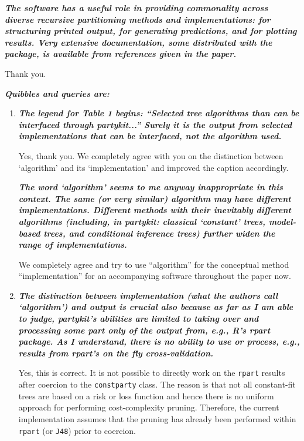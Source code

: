 \documentclass{article}
\begin{document}
\medskip

\textbf{\textit{%
The software has a useful role in providing commonality across diverse
recursive partitioning methods and implementations: for structuring printed
output, for generating predictions, and for plotting results.  Very
extensive documentation, some distributed with the package, is available
from references given in the paper.
}}

\smallskip

Thank you.

\medskip

\textbf{\textit{%
Quibbles and queries are:
}}
\begin{enumerate}
\item 
\textbf{\textit{%
The legend for Table 1 begins: ``Selected tree algorithms than can be
interfaced through partykit...''  Surely it is the output from selected
implementations that can be interfaced, not the algorithm used.
}}

\smallskip

Yes, thank you. We completely agree with you on the distinction between
`algorithm' and its `implementation' and improved the caption accordingly.

\medskip

\textbf{\textit{%
The word `algorithm' seems to me anyway inappropriate in this context. The
same (or very similar) algorithm may have different implementations.  Different
methods with their inevitably different algorithms (including, in partykit:
classical `constant' trees, model-based trees, and conditional inference
trees) further widen the range of implementations.
}}

\smallskip

We completely agree and try to use ``algorithm'' for the conceptual method
``implementation'' for an accompanying software throughout the paper now.

\item 
\textbf{\textit{%
The distinction between implementation (what the authors call `algorithm')
and output is crucial also because as far as I am able to judge, partykit's
abilities are limited to taking over and processing some part only of the
output from, e.g., R's rpart package.  As I understand, there is no ability
to use or process, e.g., results from rpart's on the fly cross-validation.
}}

\smallskip

Yes, this is correct. It is not possible to directly work on the \texttt{rpart}
results after coercion to the \texttt{constparty} class.  The reason is that not
all constant-fit trees are based on a risk or loss function and hence there
is no uniform approach for performing cost-complexity pruning.
Therefore, the current implementation assumes that the pruning has already been
performed within \texttt{rpart} (or \texttt{J48}) prior to coercion.


\end{enumerate}
\end{document}

